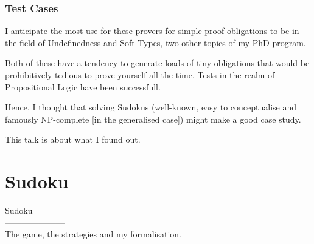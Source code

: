 \documentclass[aspectratio=169, usenames, dvipsnames]{beamer}
\begin{document}
\begin{frame}
\frametitle{Test Cases}
I anticipate the most use for these provers for simple proof obligations to be in the field of Undefinedness and Soft Types, two other topics of my PhD program.
\medskip

Both of these have a tendency to generate loads of tiny obligations that would be prohibitively tedious to prove yourself all the time. Tests in the realm of Propositional Logic have been successfull.
\bigskip\pause

Hence, I thought that solving Sudokus (well-known, easy to conceptualise and famously NP-complete [in the generalised case]) might make a good case study.

This talk is about what I found out. 
\end{frame}

\section{Sudoku}

\begin{frame}
\Huge
\begin{center}
Sudoku\large\\
---------------------\\
The game, the strategies and my formalisation.
\end{center}
\end{frame}
\end{document}
